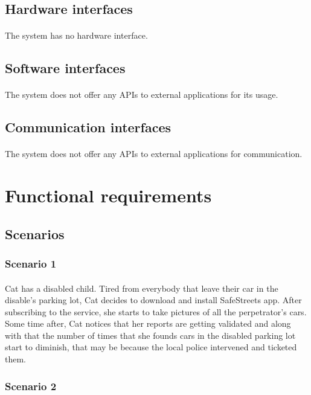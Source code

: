 			\subsection{Hardware interfaces}
				\paragraph{}
					The system has no hardware interface.
			\subsection{Software interfaces}
				\paragraph{}
					The system does not offer any APIs to external applications for its usage.
			\subsection{Communication interfaces}
				\paragraph{}
					The system does not offer any APIs to external applications for communication.
		\section{Functional requirements}
			\subsection{Scenarios}
				\subsubsection{Scenario 1}
					\paragraph{}
						Cat has a disabled child. Tired from everybody that leave their car in the disable's parking lot, Cat decides to download and install SafeStreets app. After subscribing to the service, she starts to take pictures of all the perpetrator's cars. Some time after, Cat notices that her reports are getting validated and along with that the number of times that she founds cars in the disabled parking lot start to diminish, that may be because the local police intervened and ticketed them.
				\subsubsection{Scenario 2}
